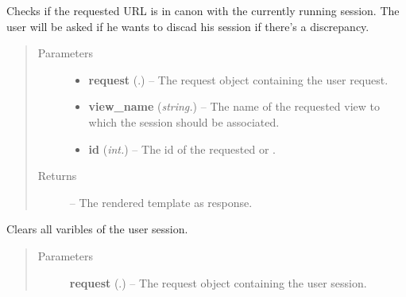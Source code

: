 \documentclass[letterpaper,10pt,english]{sphinxmanual}
\begin{document}

\begin{fulllineitems}
\label{Contour.contour:Contour.contour.views.check_session}
Checks if the requested URL is in canon with the currently running session. The user will be asked if he wants to discad his session if there's a discrepancy.
\begin{quote}\begin{description}
\item[{Parameters}] \leavevmode\begin{itemize}
\item {} 
\textbf{request} (.) -- The request object containing the user request.

\item {} 
\textbf{view\_name} (\emph{string.}) -- The name of the requested view to which the session should be associated.

\item {} 
\textbf{id} (\emph{int.}) -- The id of the requested {\hyperref[Contour.contour:Contour.contour.models.Image]{}} or {\hyperref[Contour.contour:Contour.contour.models.Track]{}}.

\end{itemize}

\item[{Returns}] \leavevmode
{} -- The rendered template as response.

\end{description}\end{quote}

\end{fulllineitems}


\begin{fulllineitems}
\label{Contour.contour:Contour.contour.views.clear_session}
Clears all varibles of the user session.
\begin{quote}\begin{description}
\item[{Parameters}] \leavevmode
\textbf{request} (.) -- The request object containing the user session.

\end{description}\end{quote}

\end{fulllineitems}
\end{document}
